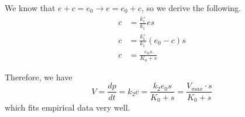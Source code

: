 \documentclass[10pt]{article}
\begin{document}
We know that $e + c = e_0 \rightarrow e = e_0 + c$, so we derive the following.
\begin{align*}
c &= \frac{k_1^{+}}{k_1^{-}}es \\
c &= \frac{k_1^{+}}{k_1^{-}}(e_0 - c)s \\
c &= \frac{e_0s}{K_0 + s}
\end{align*}

Therefore, we have \[ V = \frac{dp}{dt} = k_2c = \frac{k_2e_0s}{K_0 + s} = \frac{V_{max} \cdot s}{K_0 + s} \] which fits empirical data very well.
\end{document}
